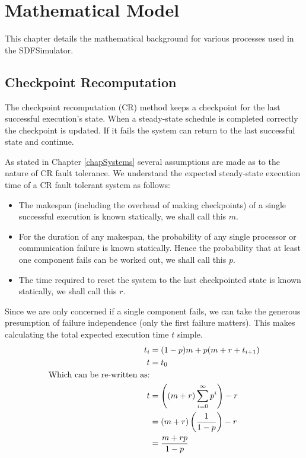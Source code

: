 \chapter{Mathematical Model}
\label{chapModel}

This chapter details the mathematical background for various processes used in the SDFSimulator.

\section{Checkpoint Recomputation}
The checkpoint recomputation (CR) method keeps a checkpoint for the last successful execution's state.
When a steady-state schedule is completed correctly the checkpoint is updated.
If it fails the system can return to the last successful state and continue.

As stated in Chapter \ref{chapSystems} several assumptions are made as to the nature of CR fault tolerance.
We understand the expected steady-state execution time of a CR fault tolerant system as follows:
\begin{itemize}
	\item The makespan (including the overhead of making checkpoints) of a single successful execution is known statically, we shall call this $m$.
	\item For the duration of any makespan, the probability of any single processor or communication failure is known statically.
			Hence the probability that at least one component fails can be worked out, we shall call this $p$.
	\item The time required to reset the system to the last checkpointed state is known statically, we shall call this $r$.
\end{itemize}

Since we are only concerned if a single component fails, we can take the generous presumption of failure independence (only the first failure matters).
This makes calculating the total expected execution time $t$ simple.
\begin{align}
	\nonumber t_i & = (1-p)m + p(m + r + t_{i+1}) \\
	\nonumber t & = t_0 \\
	\nonumber \mbox{Which can be re-written as:}& \\
	\nonumber t & = \left({(m+r)\displaystyle\sum\limits_{i=0}^\infty p^i }\right) - r \\
	\nonumber & = (m+r)\left({{1}\over{1-p}}\right) - r\\
	\nonumber & = {{m+rp}\over{1-p}}
\end{align}

